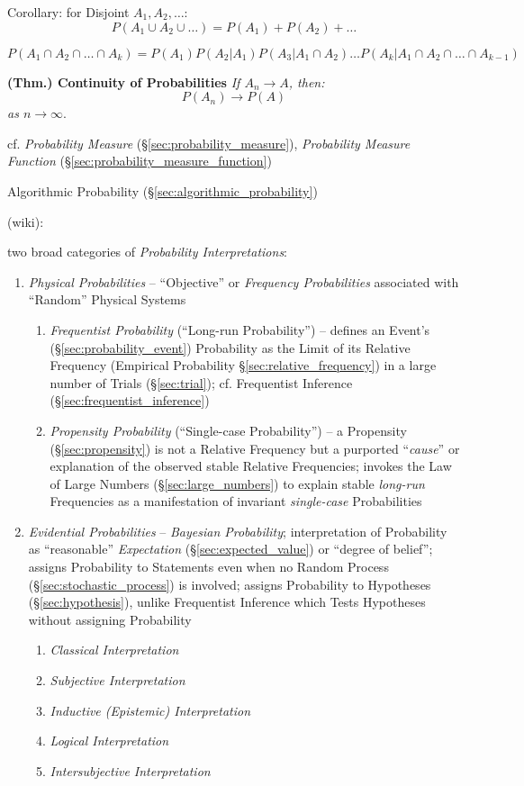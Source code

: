 Corollary: for Disjoint $A_1, A_2, \ldots$:
\[
  P(A_1 \cup A_2 \cup \ldots) = P(A_1) + P(A_2) + \ldots
\]

$P(A_1 \cap A_2 \cap \ldots \cap A_k) = P(A_1) P(A_2 | A_1) P(A_3 |
A_1 \cap A_2) \ldots P(A_k | A_1 \cap A_2 \cap \ldots \cap A_{k-1})$

\textbf{(Thm.) Continuity of Probabilities} \emph{If $A_n \to A$, then:}
\[
  P(A_n) \to P(A)
\]
\emph{as $n \to \infty$}.

cf. \emph{Probability Measure} (\S\ref{sec:probability_measure}),
\emph{Probability Measure Function} (\S\ref{sec:probability_measure_function})

\fist Algorithmic Probability (\S\ref{sec:algorithmic_probability})

(wiki):

two broad categories of \emph{Probability Interpretations}:
\begin{enumerate}
  \item \emph{Physical Probabilities} -- ``Objective'' or \emph{Frequency
    Probabilities} associated with ``Random'' Physical Systems
    \begin{enumerate}
      \item \emph{Frequentist Probability} (``Long-run Probability'') -- defines
        an Event's (\S\ref{sec:probability_event}) Probability as the Limit of
        its Relative Frequency (Empirical Probability
        \S\ref{sec:relative_frequency}) in a large number of Trials
        (\S\ref{sec:trial}); cf. Frequentist Inference
        (\S\ref{sec:frequentist_inference})
      \item \emph{Propensity Probability} (``Single-case Probability'') -- a
        Propensity (\S\ref{sec:propensity}) is not a Relative Frequency but a
        purported ``\emph{cause}'' or explanation of the observed stable
        Relative Frequencies; invokes the Law of Large Numbers
        (\S\ref{sec:large_numbers}) to explain stable \emph{long-run}
        Frequencies as a manifestation of invariant \emph{single-case}
        Probabilities
    \end{enumerate}
  \item \emph{Evidential Probabilities} -- \emph{Bayesian Probability};
    interpretation of Probability as ``reasonable'' \emph{Expectation}
    (\S\ref{sec:expected_value}) or ``degree of belief''; assigns Probability to
    Statements even when no Random Process (\S\ref{sec:stochastic_process}) is
    involved; assigns Probability to Hypotheses (\S\ref{sec:hypothesis}), unlike
    Frequentist Inference which Tests Hypotheses without assigning Probability
    \begin{enumerate}
      \item \emph{Classical Interpretation}
      \item \emph{Subjective Interpretation}
      \item \emph{Inductive (Epistemic) Interpretation}
      \item \emph{Logical Interpretation}
      \item \emph{Intersubjective Interpretation}
    \end{enumerate}
\end{enumerate}

